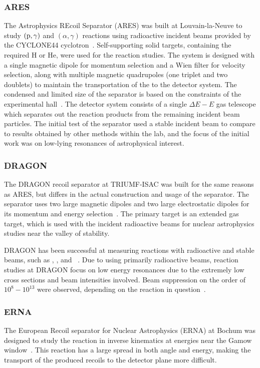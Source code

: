 \subsubsection{ARES}
The Astrophysics REcoil Separator (ARES) was built at Louvain-la-Neuve to
study $(\rm{p},\gamma)$ and $(\alpha,\gamma)$ reactions using radioactive
incident beams provided by the CYCLONE44 cyclotron~\cite{Angulo2001}.
Self-supporting solid targets, containing the required H or He, were used for
the reaction studies. The system is designed with a single magnetic dipole for
momentum selection and a Wien filter for velocity selection, along with
multiple magnetic quadrupoles (one triplet and two doublets) to maintain the
transportation of the to the
detector system. The condensed and limited size of the separator is based on
the constraints of the experimental hall~\cite{Couder2003}. The detector system
consists of a single $\Delta E − E$ gas telescope which separates out the reaction
products from the remaining incident beam particles. The initial test of the
separator used a stable incident beam to compare to results obtained by other
methods within the lab, and the focus of the initial work was on low-lying
resonances of astrophysical interest.

\subsubsection{DRAGON}
The DRAGON recoil separator at TRIUMF-ISAC was built for the same reasons as ARES,
but differs in the actual construction and usage of the separator. The
separator uses two large magnetic dipoles and two large electrostatic dipoles
for its momentum and energy selection~\cite{Engel2005}. The primary target is
an extended gas target, which is used with the incident radioactive beams for
nuclear astrophysics studies near the valley of stability.

DRAGON has been successful at measuring reactions with radioactive and stable
beams, such as ,
, and
~\cite{Engel2005}.
Due to using primarily radioactive beams, reaction studies at DRAGON focus on
low energy resonances due to the extremely low cross sections and beam
intensities involved. Beam suppression on the order of $10^{8} - 10^{13}$ were
observed, depending on the reaction in question~\cite{Engel2005}.

\subsubsection{ERNA}
The European Recoil separator for Nuclear Astrophysics (ERNA) at Bochum was
designed to study the 
reaction in inverse kinematics at energies near the Gamow
window~\cite{Rogalla2003}. This reaction has a large spread in both angle and
energy, making the transport of the produced recoils to the detector plane
more difficult.


